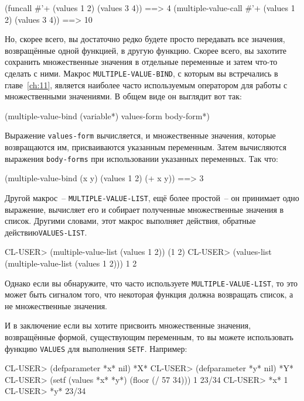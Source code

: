 \begin{myverb}
(funcall #'+ (values 1 2) (values 3 4))             ==> 4
(multiple-value-call #'+ (values 1 2) (values 3 4)) ==> 10
\end{myverb}

Но, скорее всего, вы достаточно редко будете просто передавать все значения, возвращённые
одной функцией, в другую функцию.  Скорее всего, вы захотите сохранить множественные
значения в отдельные переменные и затем что-то сделать с ними.  Макрос
\lstinline{MULTIPLE-VALUE-BIND}, с которым вы встречались в главе~\ref{ch:11}, является
наиболее часто используемым оператором для работы с множественными значениями.  В общем
виде он выглядит вот так:

\begin{myverb}
(multiple-value-bind (variable*) values-form
  body-form*)
\end{myverb}

Выражение \lstinline{values-form} вычисляется, и множественные значения, которые возвращаются
им, присваиваются указанным переменным.  Затем вычисляются выражения \lstinline{body-forms}
при использовании указанных переменных.  Так что:

\begin{myverb}
(multiple-value-bind (x y) (values 1 2)
  (+ x y)) ==> 3
\end{myverb}

Другой макрос~-- \lstinline{MULTIPLE-VALUE-LIST}, ещё более простой~-- он принимает одно
выражение, вычисляет его и собирает полученные множественные значения в список.  Другими
словами, этот макрос выполняет действия, обратные действию\lstinline{VALUES-LIST}.

\begin{myverb}
CL-USER> (multiple-value-list (values 1 2))
(1 2)
CL-USER> (values-list (multiple-value-list (values 1 2)))
1
2
\end{myverb}

Однако если вы обнаружите, что часто используете \lstinline{MULTIPLE-VALUE-LIST}, то это может
быть сигналом того, что некоторая функция должна возвращать список, а не множественные
значения.

И в заключение если вы хотите присвоить множественные значения, возвращённые формой,
существующим переменным, то вы можете использовать функцию \lstinline{VALUES} для выполнения
\lstinline{SETF}.  Например:

\begin{myverb}
CL-USER> (defparameter *x* nil)
*X*
CL-USER> (defparameter *y* nil)
*Y*
CL-USER> (setf (values *x* *y*) (floor (/ 57 34)))
1
23/34
CL-USER> *x*
1
CL-USER> *y*
23/34
\end{myverb}

